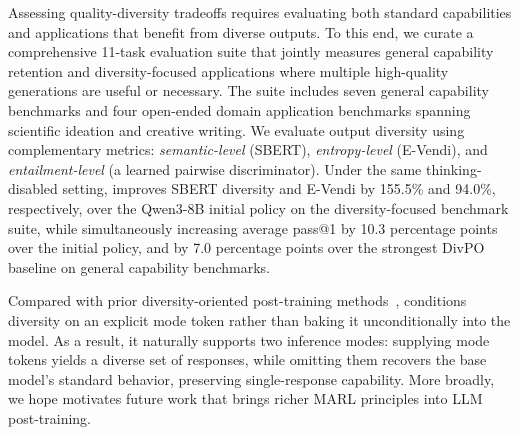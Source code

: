 Assessing quality-diversity tradeoffs requires evaluating both standard capabilities and applications that benefit from diverse outputs. To this end, we curate a comprehensive 11-task evaluation suite that jointly measures general capability retention and diversity-focused applications where multiple high-quality generations are useful or necessary. The suite includes seven general capability benchmarks and four open-ended domain application benchmarks spanning scientific ideation and creative writing. We evaluate output diversity using complementary metrics: \textit{semantic-level} (SBERT), \textit{entropy-level} (E-Vendi), and \textit{entailment-level} (a learned pairwise discriminator). Under the same thinking-disabled setting, \method{} improves SBERT diversity and E-Vendi by 155.5\% and 94.0\%, respectively, over the Qwen3-8B initial policy on the diversity-focused benchmark suite, while simultaneously increasing average pass@1 by 10.3 percentage points over the initial policy, and by 7.0 percentage points over the strongest DivPO baseline on general capability benchmarks.

Compared with prior diversity-oriented post-training methods~\citep{li2025jointlyreinforcingdiversityquality, lanchantin2025diverse, chung2025modifyinglargelanguagemodel, Chen2025PosttrainingLL}, \method{} conditions diversity on an explicit mode token rather than baking it unconditionally into the model. As a result, it naturally supports two inference modes: supplying mode tokens yields a diverse set of responses, while omitting them recovers the base model's standard behavior, preserving single-response capability. More broadly, we hope \method{} motivates future work that brings richer MARL principles into LLM post-training.







